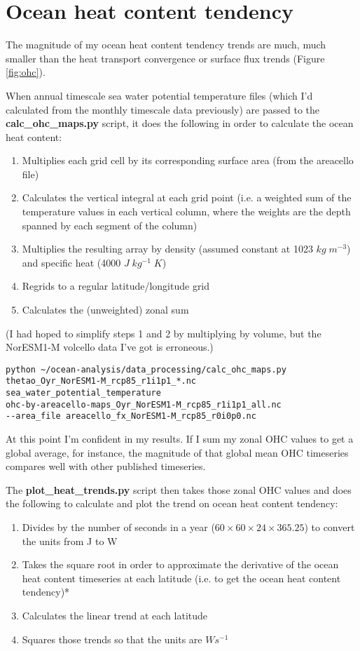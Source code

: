 \section{Ocean heat content tendency}

The magnitude of my ocean heat content tendency trends are much, much smaller than the heat transport convergence or surface flux trends (Figure \ref{fig:ohc}). 

When annual timescale sea water potential temperature files (which I'd calculated from the monthly timescale data previously) are passed to the \textbf{calc_ohc_maps.py} script, it does the following in order to calculate the ocean heat content:
\begin{enumerate}
\item Multiplies each grid cell by its corresponding surface area (from the areacello file)
\item Calculates the vertical integral at each grid point (i.e. a weighted sum of the temperature values in each vertical column, where the weights are the depth spanned by each segment of the column)
\item Multiplies the resulting array by density (assumed constant at 1023 $kg\; m^{-3}$) and specific heat (4000 $J\; kg^{-1}\; K$)
\item Regrids to a regular latitude/longitude grid
\item Calculates the (unweighted) zonal sum
\end{enumerate}

(I had hoped to simplify steps 1 and 2 by multiplying by volume, but the NorESM1-M volcello data I've got is erroneous.) 

\begin{verbatim}
python ~/ocean-analysis/data_processing/calc_ohc_maps.py 
thetao_Oyr_NorESM1-M_rcp85_r1i1p1_*.nc 
sea_water_potential_temperature 
ohc-by-areacello-maps_Oyr_NorESM1-M_rcp85_r1i1p1_all.nc 
--area_file areacello_fx_NorESM1-M_rcp85_r0i0p0.nc
\end{verbatim}

At this point I'm confident in my results. If I sum my zonal OHC values to get a global average, for instance, the magnitude of that global mean OHC timeseries compares well with other published timeseries.

The \textbf{plot_heat_trends.py} script then takes those zonal OHC values and does the following to calculate and plot the trend on ocean heat content tendency:
\begin{enumerate}
\item Divides by the number of seconds in a year ($60 \times 60 \times 24 \times 365.25$) to convert the units from J to W
\item Takes the square root in order to approximate the derivative of the ocean heat content timeseries at each latitude (i.e. to get the ocean heat content tendency)*
\item Calculates the linear trend at each latitude
\item Squares those trends so that the units are $W s^{-1}$
\end{enumerate}

